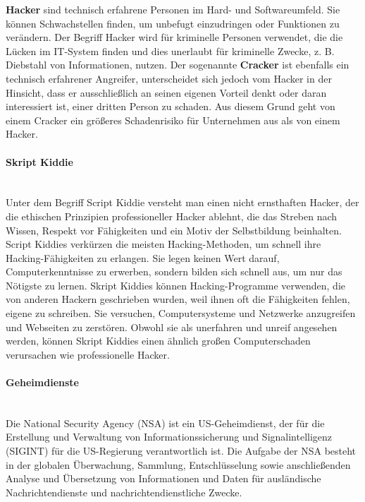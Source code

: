 \textbf{Hacker} sind technisch erfahrene Personen im Hard- und Softwareumfeld. Sie können Schwachstellen finden, um unbefugt einzudringen oder Funktionen zu verändern\cite{hack17}. Der Begriff Hacker wird für kriminelle Personen verwendet, die die Lücken im IT-System finden und dies unerlaubt für kriminelle Zwecke, z. B. Diebstahl von Informationen, nutzen\cite{hack11}.  Der sogenannte \textbf{Cracker} ist ebenfalls ein technisch erfahrener Angreifer, unterscheidet sich jedoch vom Hacker in der Hinsicht, dass er ausschließlich an seinen eigenen Vorteil denkt oder daran interessiert ist, einer dritten Person zu schaden. Aus diesem Grund geht von einem Cracker ein größeres Schadenrisiko für Unternehmen aus als von einem Hacker\cite[45]{eckert2013sicherheit}.

\paragraph{Skript Kiddie}\mbox{}\\

Unter dem Begriff Script Kiddie versteht man einen nicht ernsthaften Hacker, der die ethischen Prinzipien professioneller Hacker ablehnt, die das Streben nach Wissen, Respekt vor Fähigkeiten und ein Motiv der Selbstbildung beinhalten. Script Kiddies verkürzen die meisten Hacking-Methoden, um schnell ihre Hacking-Fähigkeiten zu erlangen. Sie legen keinen Wert darauf, Computerkenntnisse zu erwerben, sondern bilden sich schnell aus, um nur das Nötigste zu lernen. Skript Kiddies können Hacking-Programme verwenden, die von anderen Hackern geschrieben wurden, weil ihnen oft die Fähigkeiten fehlen, eigene zu schreiben. Sie versuchen, Computersysteme und Netzwerke anzugreifen und Webseiten zu zerstören. Obwohl sie als unerfahren und unreif angesehen werden, können Skript Kiddies einen ähnlich großen Computerschaden verursachen wie professionelle Hacker\cite{scriptkiddie11}.

\paragraph{Geheimdienste}\mbox{}\\

Die National Security Agency (NSA) ist ein US-Geheimdienst, der für die Erstellung und Verwaltung von Informationssicherung und Signalintelligenz (SIGINT) für die US-Regierung verantwortlich ist. Die Aufgabe der NSA besteht in der globalen Überwachung, Sammlung, Entschlüsselung sowie anschließenden Analyse und Übersetzung von Informationen und Daten für ausländische Nachrichtendienste und nachrichtendienstliche Zwecke\cite{nsa14}.

